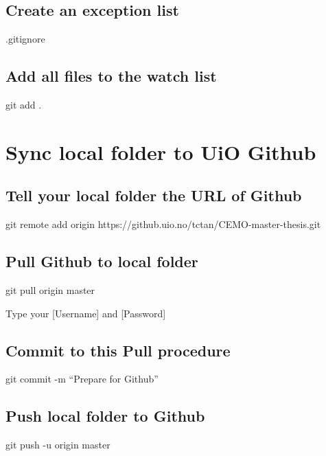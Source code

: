 \subsection{Create an exception list}

.gitignore

\subsection{Add all files to the watch list}

git add .




\section{Sync local folder to UiO Github}

\subsection{Tell your local folder the URL of Github}

git remote add origin https://github.uio.no/tctan/CEMO-master-thesis.git

\subsection{Pull Github to local folder}

git pull origin master

Type your [Username] and [Password]

\subsection{Commit to this Pull procedure}

git commit -m ``Prepare for Github''

\subsection{Push local folder to Github}

git push -u origin master






